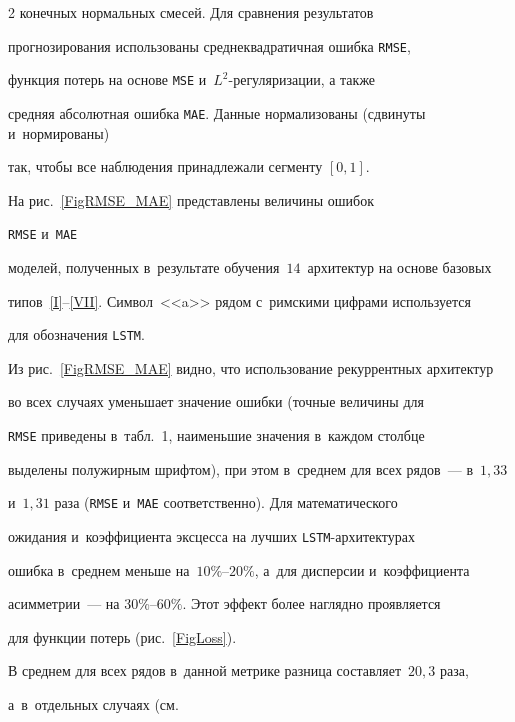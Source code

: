 \begin{multicols}{2}
 конечных нормальных смесей. Для сравнения результатов 

прогнозирования использованы сред\-не\-квад\-ра\-тич\-ная ошибка \verb"RMSE", 

функция потерь на основе \verb"MSE" и~$L^2$-регуляризации, а также 

средняя абсолютная ошибка \verb"MAE". Данные нормализованы (сдвинуты и~нормированы) 

так, чтобы все наблюдения принадлежали сегменту $[0, 1]$.



На рис.~\ref{FigRMSE_MAE} представлены величины ошибок\linebreak

 \verb"RMSE" и~\verb"MAE" 

моделей, полученных в~результате обучения~$14$~архитектур на основе базовых 

типов~\ref{I}--\ref{VII}. Символ~<<a>> рядом с~римскими цифрами используется 

для обозначения \verb"LSTM".







Из рис.~\ref{FigRMSE_MAE} видно, что использование рекуррентных архитектур 

во всех случаях уменьшает значение ошибки (точные величины для 

\verb"RMSE" приведены в~табл.~1, наименьшие значения в~каж\-дом столбце 

выделены полужирным шрифтом), при этом в~среднем для всех рядов~--- в~$1{,}33$ 

и~$1{,}31$ раза (\verb"RMSE" и~\verb"MAE" соответственно). Для математического 

ожидания и~коэффициента эксцесса на лучших \verb"LSTM"-ар\-хи\-тек\-ту\-рах 

ошибка в~среднем меньше на~$10\%$--$20\%$, а~для дисперсии и~коэффициента 

асимметрии~--- на $30\%$--$60\%$.  Этот эффект более наглядно проявляется 

для функции потерь (рис.~\ref{FigLoss}).







В среднем для всех рядов в~данной метрике разница составляет~$20{,}3$ раза, 

а~в~отдельных случаях (см.\linebreak\vspace*{-12pt}



\pagebreak







\end{multicols}



